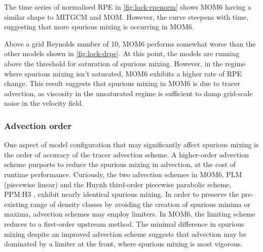
The time series of normalised RPE in \cref{fig:lock-rpenorm} shows MOM6 having a similar shape to MITGCM and MOM. However, the curve steepens with time, suggesting that more spurious mixing is occurring in MOM6.


Above a grid Reynolds number of 10, MOM6 performs somewhat worse than the other models shown in \cref{fig:lock-drpe}. At this point, the models are running above the threshold for saturation of spurious mixing. However, in the regime where spurious mixing isn't saturated, MOM6 exhibits a higher rate of RPE change. This result suggests that spurious mixing in MOM6 is due to tracer advection, as viscosity in the unsaturated regime is sufficient to damp grid-scale noise in the velocity field.


\subsubsection{Advection order}
One aspect of model configuration that may significantly affect spurious mixing is the order of accuracy of the tracer advection scheme. A higher-order advection scheme purports to reduce the spurious mixing in advection, at the cost of runtime performance. Curiously, the two advection schemes in MOM6, PLM (piecewise linear) and the Huynh third-order piecewise parabolic scheme, PPM:H3 \citep{huynh97}, exhibit nearly identical spurious mixing. In order to preserve the pre-existing range of density classes by avoiding the creation of spurious minima or maxima, advection schemes may employ limiters. In MOM6, the limiting scheme reduces to a first-order upstream method. The minimal difference in spurious mixing despite an improved advection scheme suggests that advection may be dominated by a limiter at the front, where spurious mixing is most vigorous.


